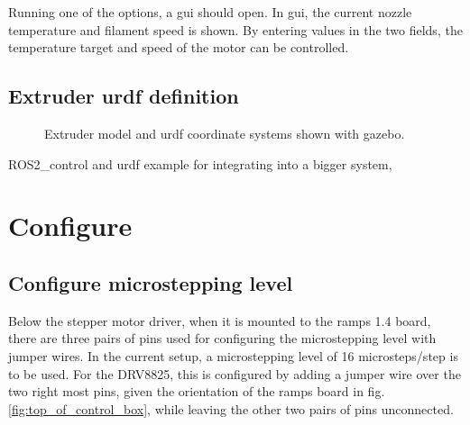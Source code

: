 \documentclass[10pt]{article}
\begin{document}
Running one of the options, a gui should open. In gui, the current nozzle temperature and filament speed is shown. By entering values in the two fields, the temperature target and speed of the motor can be controlled.

\subsection{Extruder urdf definition}


\begin{figure}[h]
	\centering
	{%
	\setlength{\fboxsep}{0pt}%
	\setlength{\fboxrule}{1pt}%
	}%
	\caption{Extruder model and urdf coordinate systems shown with gazebo.}
	\label{fig:extruder_urdf_model_gazebo}
\end{figure}


ROS2\_control and urdf example for integrating into a bigger system,

\newpage
\section{Configure}
\subsection{Configure microstepping level}
Below the stepper motor driver, when it is mounted to the ramps 1.4 board, there are three pairs of pins used for configuring the microstepping level with jumper wires. In the current setup, a microstepping level of 16 microsteps/step is to be used. For the DRV8825, this is configured by adding a jumper wire over the two right most pins, given the orientation of the ramps board in fig. \ref{fig:top_of_control_box}, while leaving the other two pairs of pins unconnected.
\end{document}

